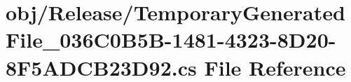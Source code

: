 \hypertarget{_release_2_temporary_generated_file__036_c0_b5_b-1481-4323-8_d20-8_f5_a_d_c_b23_d92_8cs}{
\section{obj/Release/TemporaryGeneratedFile\_\-036C0B5B-\/1481-\/4323-\/8D20-\/8F5ADCB23D92.cs File Reference}
\label{_release_2_temporary_generated_file__036_c0_b5_b-1481-4323-8_d20-8_f5_a_d_c_b23_d92_8cs}
}
